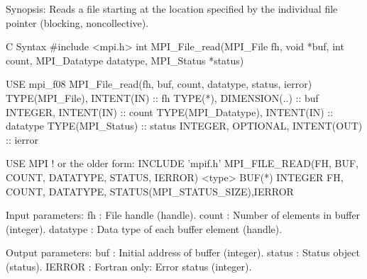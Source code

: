 Synopsis:
Reads a file starting at the location specified by the
individual file pointer (blocking, noncollective).

C Syntax
#include <mpi.h>
int MPI_File_read(MPI_File fh, void *buf,
    int count, MPI_Datatype datatype, MPI_Status *status)

USE mpi_f08
MPI_File_read(fh, buf, count, datatype, status, ierror)
    TYPE(MPI_File), INTENT(IN) :: fh
    TYPE(*), DIMENSION(..) :: buf
    INTEGER, INTENT(IN) :: count
    TYPE(MPI_Datatype), INTENT(IN) :: datatype
    TYPE(MPI_Status) :: status
    INTEGER, OPTIONAL, INTENT(OUT) :: ierror

USE MPI
! or the older form: INCLUDE ’mpif.h’
MPI_FILE_READ(FH, BUF, COUNT,
    DATATYPE, STATUS, IERROR)
    <type>    BUF(*)
    INTEGER    FH, COUNT, DATATYPE, STATUS(MPI_STATUS_SIZE),IERROR

Input parameters:
fh : File handle (handle). 
count : Number of elements in buffer (integer). 
datatype : Data type of each buffer element (handle). 

Output parameters:
buf : Initial address of buffer (integer). 
status : Status object (status). 
IERROR : Fortran only: Error status (integer). 
